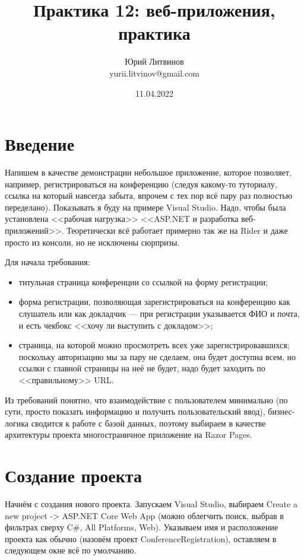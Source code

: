 \documentclass[a5paper]{article}
\title{Практика 12: веб-приложения, практика}
\author{Юрий Литвинов\\\small{yurii.litvinov@gmail.com}}
\date{11.04.2022}
\begin{document}
\maketitle
\thispagestyle{empty}

\section{Введение}

Напишем в качестве демонстрации небольшое приложение, которое позволяет, например, регистрироваться на конференцию (следуя какому-то туториалу, ссылка на который навсегда забыта, впрочем с тех пор всё пару раз полностью переделано). Показывать я буду на примере Visual Studio. Надо, чтобы была установлена <<рабочая нагрузка>> <<ASP.NET и разработка веб-приложений>>. Теоретически всё работает примерно так же на Rider и даже просто из консоли, но не исключены сюрпризы.

Для начала требования:

\begin{itemize}
    \item титульная страница конференции со ссылкой на форму регистрации;
    \item форма регистрации, позволяющая зарегистрироваться на конференцию как слушатель или как докладчик --- при регистрации указывается ФИО и почта, и есть чекбокс <<хочу ли выступить с докладом>>;
    \item страница, на которой можно просмотреть всех уже зарегистрировавшихся; поскольку авторизацию мы за пару не сделаем, она будет доступна всем, но ссылки с главной страницы на неё не будет, надо будет заходить по <<правильному>> URL.
\end{itemize}

Из требований понятно, что взаимодействие с пользователем минимально (по сути, просто показать информацию и получить пользовательский ввод), бизнес-логика сводится к работе с базой данных, поэтому выбираем в качестве архитектуры проекта многостраничное приложение на Razor Pages.

\section{Создание проекта}

Начнём с создания нового проекта. Запускаем Visual Studio, выбираем Create a new project -> ASP.NET Core Web App (можно облегчить поиск, выбрав в фильтрах сверху C\#, All Platforms, Web). Указываем имя и расположение проекта как обычно (назовём проект ConferenceRegistration), оставляем в следующем окне всё по умолчанию.
\end{document}

